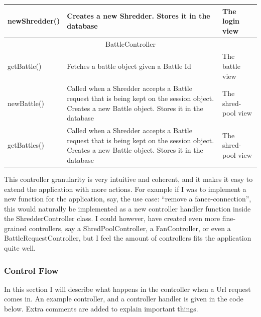 \begin{center}
\begin{tabular}{ |  l  | p{6cm} |  l  |}
newShredder() & Creates a new Shredder. Stores it in the database & The login view \\  \hline

 \multicolumn{3}{|c|}{BattleController} \\ \hline
 getBattle() & Fetches a battle object given a Battle Id & The battle view \\ \hline

newBattle() & Called when a Shredder accepts a Battle request that is being kept on the session object. Creates a new Battle object. Stores it in the database & The shred-pool view \\ \hline

getBattles() & Called when a Shredder accepts a Battle request that is being kept on the session object. Creates a new Battle object. Stores it in the database & The shred-pool view \\ \hline


    \end{tabular}
\end{center}

This controller granularity is very intuitive and coherent, and it makes it easy to extend the application with more actions. For example if I was to implement a new function for the application, say, the use case: ``remove a fanee-connection'', this would naturally be implemented as a new controller handler function inside the ShredderController class. I could however, have created even more fine-grained controllers, say a ShredPoolController, a FanController, or even a BattleRequestController, but I feel the amount of controllers fits the application quite well. 

\subsubsection{Control Flow}
In this section I will describe what happens in the controller when a Url request comes in. An example controller, and a controller handler is given in the code below. Extra comments are added to explain important things.
		

